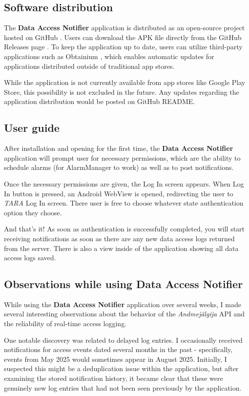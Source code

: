 \subsection{Software distribution}

The \textbf{Data Access Notifier} application is distributed as an open-source project hosted on GitHub \cite{data-access-notifier}. Users can download the APK file directly from the GitHub Releases page \cite{data-access-notifier-releases}. To keep the application up to date, users can utilize third-party applications such as Obtainium \cite{obtainium}, which enables automatic updates for applications distributed outside of traditional app stores.

While the application is not currently available from app stores like Google Play Store, this possibility is not excluded in the future. Any updates regarding the application distribution would be posted on GitHub README.

\subsection{User guide}
After installation and opening for the first time, the \textbf{Data Access Notifier} application will prompt user for necessary permissions, which are the ability to schedule alarms (for AlarmManager to work) as well as to post notifications.

Once the necessary permissions are given, the Log In screen appears. When Log In button is pressed, an Android WebView is opened, redirecting the user to \textit{TARA} Log In screen. There user is free to choose whatever state authentication option they choose.

And that's it! As soon as authentication is successfully completed, you will start receiving notifications as soon as there are any new data access logs returned from the server. There is also a view inside of the application showing all data access logs saved.

\subsection{Observations while using \textbf{Data Access Notifier}}

While using the \textbf{Data Access Notifier} application over several weeks, I made several interesting observations about the behavior of the \textit{Andmejälgija} API and the reliability of real-time access logging.

One notable discovery was related to delayed log entries. I occasionally received notifications for access events dated several months in the past - specifically, events from May 2025 would sometimes appear in August 2025. Initially, I suspected this might be a deduplication issue within the application, but after examining the stored notification history, it became clear that these were genuinely new log entries that had not been seen previously by the application.

